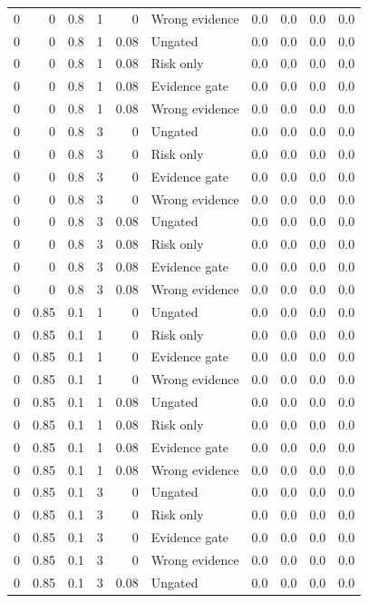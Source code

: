 \begin{longtable}{rrrrrlrrrr}
0 & 0 & 0.8 & 1 & 0 & Wrong evidence & 0.0 & 0.0 & 0.0 & 0.0\\
0 & 0 & 0.8 & 1 & 0.08 & Ungated & 0.0 & 0.0 & 0.0 & 0.0\\
0 & 0 & 0.8 & 1 & 0.08 & Risk only & 0.0 & 0.0 & 0.0 & 0.0\\
0 & 0 & 0.8 & 1 & 0.08 & Evidence gate & 0.0 & 0.0 & 0.0 & 0.0\\
0 & 0 & 0.8 & 1 & 0.08 & Wrong evidence & 0.0 & 0.0 & 0.0 & 0.0\\
0 & 0 & 0.8 & 3 & 0 & Ungated & 0.0 & 0.0 & 0.0 & 0.0\\
0 & 0 & 0.8 & 3 & 0 & Risk only & 0.0 & 0.0 & 0.0 & 0.0\\
0 & 0 & 0.8 & 3 & 0 & Evidence gate & 0.0 & 0.0 & 0.0 & 0.0\\
0 & 0 & 0.8 & 3 & 0 & Wrong evidence & 0.0 & 0.0 & 0.0 & 0.0\\
0 & 0 & 0.8 & 3 & 0.08 & Ungated & 0.0 & 0.0 & 0.0 & 0.0\\
0 & 0 & 0.8 & 3 & 0.08 & Risk only & 0.0 & 0.0 & 0.0 & 0.0\\
0 & 0 & 0.8 & 3 & 0.08 & Evidence gate & 0.0 & 0.0 & 0.0 & 0.0\\
0 & 0 & 0.8 & 3 & 0.08 & Wrong evidence & 0.0 & 0.0 & 0.0 & 0.0\\
0 & 0.85 & 0.1 & 1 & 0 & Ungated & 0.0 & 0.0 & 0.0 & 0.0\\
0 & 0.85 & 0.1 & 1 & 0 & Risk only & 0.0 & 0.0 & 0.0 & 0.0\\
0 & 0.85 & 0.1 & 1 & 0 & Evidence gate & 0.0 & 0.0 & 0.0 & 0.0\\
0 & 0.85 & 0.1 & 1 & 0 & Wrong evidence & 0.0 & 0.0 & 0.0 & 0.0\\
0 & 0.85 & 0.1 & 1 & 0.08 & Ungated & 0.0 & 0.0 & 0.0 & 0.0\\
0 & 0.85 & 0.1 & 1 & 0.08 & Risk only & 0.0 & 0.0 & 0.0 & 0.0\\
0 & 0.85 & 0.1 & 1 & 0.08 & Evidence gate & 0.0 & 0.0 & 0.0 & 0.0\\
0 & 0.85 & 0.1 & 1 & 0.08 & Wrong evidence & 0.0 & 0.0 & 0.0 & 0.0\\
0 & 0.85 & 0.1 & 3 & 0 & Ungated & 0.0 & 0.0 & 0.0 & 0.0\\
0 & 0.85 & 0.1 & 3 & 0 & Risk only & 0.0 & 0.0 & 0.0 & 0.0\\
0 & 0.85 & 0.1 & 3 & 0 & Evidence gate & 0.0 & 0.0 & 0.0 & 0.0\\
0 & 0.85 & 0.1 & 3 & 0 & Wrong evidence & 0.0 & 0.0 & 0.0 & 0.0\\
0 & 0.85 & 0.1 & 3 & 0.08 & Ungated & 0.0 & 0.0 & 0.0 & 0.0\\

\end{longtable}
